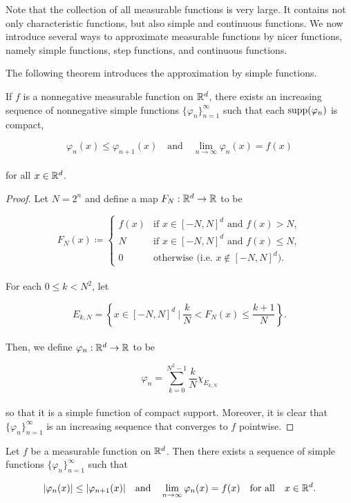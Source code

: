 \documentclass[12pt, a4paper, openany, twoside]{book}
\theoremstyle{definition}
\theoremstyle{remark}
\theoremstyle{plain}
\numberwithin{equation}{section}
\begin{document}
Note that the collection of all measurable functions is very large. It contains not only characteristic functions, but also simple and continuous functions. We now introduce several ways to approximate measurable functions by nicer functions, namely simple functions, step functions, and continuous functions.

\vspace{5mm}
The following theorem introduces the approximation by simple functions.

\vspace{5mm}
\begin{tcolorbox}[colback=yellow!10!white,colframe=red!75!black,title=Theorem 1.4.7]\label{Theorem 1.4.7}
    If $f$ is a nonnegative measurable function on ${\mathbb {R}}^d$, there exists an increasing sequence of nonnegative simple functions $\{\varphi_n\}_{n=1}^{\infty}$ such that each $\mathrm{supp}(\varphi_n)$ is compact,

    \[\varphi_{n}(x)\leq \varphi_{n+1}(x)\quad\text{and}\quad \lim_{n\rightarrow\infty}{\varphi_n(x)}=f(x)\]
    \\
    for all $x\in{\mathbb {R}}^d$.
\end{tcolorbox}
\begin{proof}
    Let $N=2^n$ and define a map $F_N:{\mathbb {R}}^d\rightarrow{\mathbb {R}}$ to be

    \[F_N(x)\coloneqq\begin{cases}
        f(x) & \text{if $x\in [-N,N]^d$ and $f(x)>N$},\\
        N & \text{if $x\in [-N,N]^d$ and $f(x)\leq N$},\\
        0 & \text{otherwise (i.e. $x\notin [-N,N]^d$)}.
    \end{cases}\]
    \\
    For each $0\leq k<N^2$, let 

    \[E_{k,N}=\left\{x\in [-N,N]^d\ \Big|\ \frac{k}{N}<F_N(x)\leq\frac{k+1}{N}\right\}.\]
    \\
    Then, we define $\varphi_n:{\mathbb {R}}^d\rightarrow{\mathbb {R}}$ to be 

    \[\varphi_n=\sum_{k=0}^{N^2-1}{\frac{k}{N}\chi_{E_{k,N}}}\]
    \\
    so that it is a simple function of compact support. Moreover, it is clear that $\{\varphi_n\}_{n=1}^{\infty}$ is an increasing sequence that converges to $f$ pointwise.
\end{proof}
\vspace{5mm}
\begin{tcolorbox}[colback=yellow!10!white,colframe=red!75!black,title=Theorem 1.4.8]\label{Theorem 1.4.8}
    Let $f$ be a measurable function on ${\mathbb {R}}^d$. Then there exists a sequence of simple functions $\{\varphi_n\}_{n=1}^{\infty}$ such that 

    \[|\varphi_n(x)|\leq |\varphi_{n+1}(x)|\quad\text{and}\quad \lim_{n\rightarrow\infty}{\varphi_n(x)}=f(x)\quad\text{for all}\quad x\in{\mathbb {R}}^d.\]
\end{tcolorbox}
\end{document}
